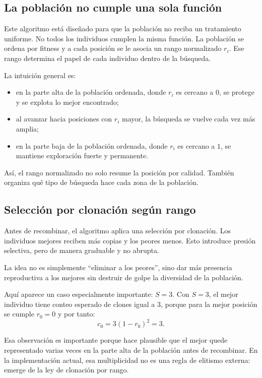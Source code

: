 \documentclass[11pt]{article}
\begin{document}
\subsection{La poblaci\'on no cumple una sola funci\'on}

Este algoritmo est\'a dise\~nado para que la poblaci\'on no reciba un
tratamiento uniforme. No todos los individuos cumplen la misma funci\'on. La
poblaci\'on se ordena por fitness y a cada posici\'on se le asocia un rango
normalizado \(r_i\). Ese rango determina el papel de cada individuo dentro de
la b\'usqueda.

La intuici\'on general es:

\begin{itemize}
  \item en la parte alta de la poblaci\'on ordenada, donde \(r_i\) es cercano a
  \(0\), se protege y se explota lo mejor encontrado;
  \item al avanzar hacia posiciones con \(r_i\) mayor, la b\'usqueda se vuelve
  cada vez m\'as amplia;
  \item en la parte baja de la poblaci\'on ordenada, donde \(r_i\) es cercano a
  \(1\), se mantiene exploraci\'on fuerte y permanente.
\end{itemize}

As\'i, el rango normalizado no solo resume la posici\'on por calidad. Tambi\'en
organiza qu\'e tipo de b\'usqueda hace cada zona de la poblaci\'on.

\subsection{Selecci\'on por clonaci\'on seg\'un rango}

Antes de recombinar, el algoritmo aplica una selecci\'on por clonaci\'on. Los
individuos mejores reciben m\'as copias y los peores menos. Esto introduce
presi\'on selectiva, pero de manera graduable y no abrupta.

La idea no es simplemente ``eliminar a los peores'', sino dar m\'as presencia
reproductiva a los mejores sin destruir de golpe la diversidad de la
poblaci\'on.

Aqu\'i aparece un caso especialmente importante: \(S=3\). Con \(S=3\), el
mejor individuo tiene conteo esperado de clones igual a \(3\), porque para la
mejor posici\'on se cumple \(r_0=0\) y por tanto:
\[
c_0 = 3(1-r_0)^2 = 3.
\]

Esa observaci\'on es importante porque hace plausible que el mejor quede
representado varias veces en la parte alta de la poblaci\'on antes de
recombinar. En la implementaci\'on actual, esa multiplicidad no es una regla de
elitismo externa: emerge de la ley de clonaci\'on por rango.
\end{document}
